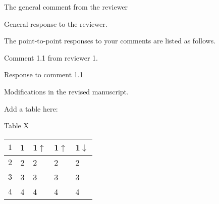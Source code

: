 \reviewer
\begin{generalcomment}
	The general comment from the reviewer
\end{generalcomment}

\begin{revmeta}[]
General response to the reviewer.

The point-to-point responses to your comments are listed as follows.
\end{revmeta}

\begin{revcomment}
\noindent	Comment 1.1 from reviewer 1.
\end{revcomment}

\begin{revresponse}
	Response to comment 1.1
    
    
\begin{changes}
Modifications in the revised manuscript.

Add a table here:

\centering
\noindent Table X

\centering
\begin{tabular}{c|clll}
\hline
$1$            & 1 &1$\uparrow$ & 1$\uparrow$ & 1$\downarrow$ \\ \hline
$2$   & 2  &2      &2     &2                   \\
$3$             & 3     &  3   & 3    &3                  \\
$4$  & 4     & 4    &4    & 4                  \\ \hline
\end{tabular}
\end{changes}
\end{revresponse}

